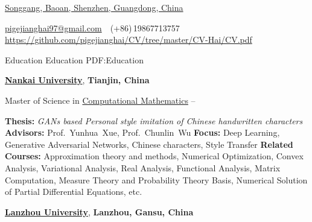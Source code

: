 \documentclass[a4paper,MMMyyyy,nonstopmode]{simpleresumecv}
\newcommand{\CVAuthor}{Hai Jiang}
\newcommand{\CVWebpage}{https://github.com/pigejianghai/CV/tree/master/CV-Hai/CV.pdf}
\begin{document}

\Title{\CVAuthor}

\begin{SubTitle}
\href{https://maps.app.goo.gl/6AtFeAEmJWizDJCKA}
{Songgang, Baoan, Shenzhen, Guangdong, China}
\par
\href{mailto:pigejianghai97@gmail.com}
{pigejianghai97@gmail.com}
\,\SubBulletSymbol\,
(+86)\,19867713757
\,\SubBulletSymbol\,
\href{\CVWebpage}
{\url{\CVWebpage}}
\end{SubTitle}

\begin{Body}


\Section
{{\large Education}}
{{\large Education}}
{PDF:Education}

\Entry
\href{https://www.nankai.edu.cn/main.htm}
{\textbf{Nankai University}},
\textbf{Tianjin, China}

\Gap
Master of Science in 
\href{https://math.nankai.edu.cn/main.htm}
{Computational Mathematics}
\hfill
{} --
\begin{Detail}
    \BulletItem
    \textbf{Thesis:}
    \emph{GANs based Personal style imitation of Chinese handwritten characters}
    \BulletItem
    \textbf{Advisors:}
    Prof.~Yunhua~Xue, Prof.~Chunlin~Wu
    \BulletItem
    \textbf{Focus:}
    Deep Learning, Generative Adversarial Networks, Chinese characters, Style Transfer
    \BulletItem
    \textbf{Related Courses:}
    Approximation theory and methods, Numerical Optimization, Convex Analysis, Variational Analysis, Real Analysis, Functional Analysis, 
    Matrix Computation, Measure Theory and Probability Theory Basis, Numerical Solution of Partial Differential Equations, etc.
\end{Detail}



\BigGap
\Entry
\href{https://www.lzu.edu.cn/}
{\textbf{Lanzhou University}},
\textbf{Lanzhou, Gansu, China}


\end{Body}
\end{document}
